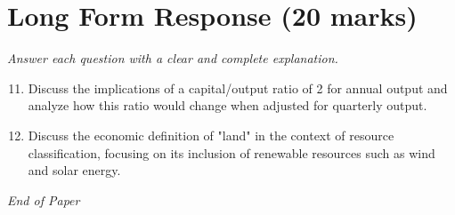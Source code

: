 \documentclass[12pt]{article}
\begin{document}
\section*{Long Form Response (20 marks)}
\textit{Answer each question with a clear and complete explanation.}
\begin{enumerate}[label=\arabic*.]
\setcounter{enumi}{10}
\item Discuss the implications of a capital/output ratio of 2 for annual output and analyze how this ratio would change when adjusted for quarterly output.
\item Discuss the economic definition of "land" in the context of resource classification, focusing on its inclusion of renewable resources such as wind and solar energy.
\end{enumerate}

\vfill
\noindent\textit{End of Paper}
\end{document}
